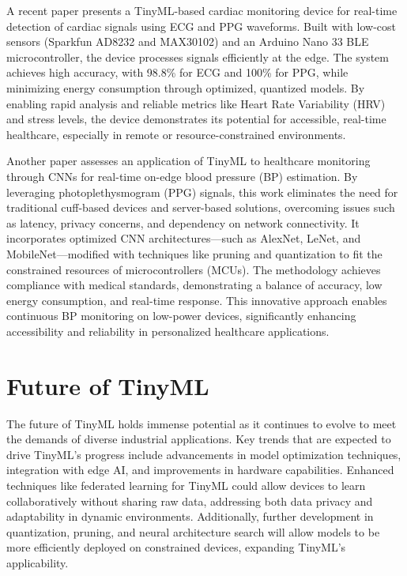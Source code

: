\documentclass[twocolumn]{article}
\begin{document}
A recent paper presents a TinyML-based cardiac monitoring device for real-time detection of cardiac signals using ECG and PPG waveforms. Built with low-cost sensors (Sparkfun AD8232 and MAX30102) and an Arduino Nano 33 BLE microcontroller, the device processes signals efficiently at the edge. The system achieves high accuracy, with 98.8\% for ECG and 100\% for PPG, while minimizing energy consumption through optimized, quantized models. By enabling rapid analysis and reliable metrics like Heart Rate Variability (HRV) and stress levels, the device demonstrates its potential for accessible, real-time healthcare, especially in remote or resource-constrained environments.\cite{r_tiny_2024}


Another paper assesses an application of TinyML to healthcare monitoring through CNNs for real-time on-edge blood pressure (BP) estimation. By leveraging photoplethysmogram (PPG) signals, this work eliminates the need for traditional cuff-based devices and server-based solutions, overcoming issues such as latency, privacy concerns, and dependency on network connectivity. It incorporates optimized CNN architectures—such as AlexNet, LeNet, and MobileNet—modified with techniques like pruning and quantization to fit the constrained resources of microcontrollers (MCUs). The methodology achieves compliance with medical standards, demonstrating a balance of accuracy, low energy consumption, and real-time response. This innovative approach enables continuous BP monitoring on low-power devices, significantly enhancing accessibility and reliability in personalized healthcare applications. \cite{sun_case_2023}

\section{Future of TinyML }
\label{future_of_tinyml}

The future of TinyML holds immense potential as it continues to evolve to meet the demands of diverse industrial applications. Key trends that are expected to drive TinyML's progress include advancements in model optimization techniques, integration with edge AI, and improvements in hardware capabilities. Enhanced techniques like federated learning for TinyML could allow devices to learn collaboratively without sharing raw data, addressing both data privacy and adaptability in dynamic environments. Additionally, further development in quantization, pruning, and neural architecture search will allow models to be more efficiently deployed on constrained devices, expanding TinyML’s applicability.
\end{document}
